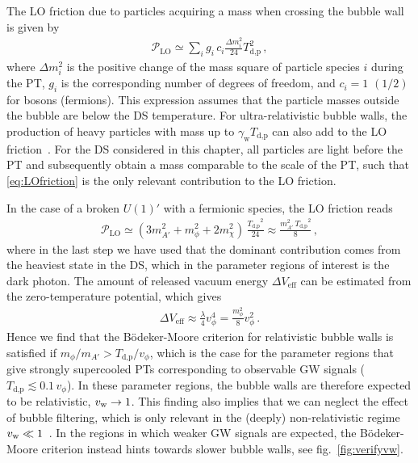 The \ac{LO} friction due to particles acquiring a mass when crossing the bubble wall is given
by~\cite{Bodeker:2009qy, Espinosa:2010hh}
\begin{align}
	\mathcal{P}_\mathrm{LO} \simeq \sum_i g_i \, c_i \frac{\Delta m_i^2}{24} T_\text{d,p}^2 \,, \label{eq:LOfriction}
\end{align}
where $\Delta m_i^2$ is the positive  change of the mass square of particle species $i$ during the \ac{PT}, $g_i$ is the corresponding number of degrees of freedom, and $c_i = 1$ $(1/2)$ for bosons (fermions). This expression assumes that the particle masses outside the bubble are below the \ac{DS} temperature. For ultra-relativistic bubble walls, the production of heavy particles with mass up to $\gamma_\text{w} T_\text{d,p}$ can also add to the \ac{LO} friction~\cite{Azatov:2020ufh}. For the \ac{DS} considered in this chapter, all particles are light before the \ac{PT} and subsequently obtain a mass comparable to the scale of the \ac{PT}, such that \eqref{eq:LOfriction} is the only relevant contribution to the \ac{LO} friction.

In the case of a broken $U(1)'$ with a fermionic species, the \ac{LO} friction reads~\cite{Espinosa:2010hh}
\begin{align}
	\mathcal{P}_\text{LO} \simeq \left(3 m_{A'}^2 + m_\phi^2 + 2 m_\chi^2\right) \, \frac{{T_{\text{d,p}}}^2}{24} \approx \frac{m_{A'}^2 \, {T_{\text{d,p}}}^2}{8} \,,
\end{align}
where in the last step we have used that the dominant contribution comes from the heaviest state in the \ac{DS}, which in the parameter regions of interest is the dark photon. The amount of released vacuum energy $\Delta V_\text{eff}$ can be estimated from the zero-temperature potential, which gives
\begin{align}
	\Delta V_\text{eff} \approx \frac{\lambda}{4} v_\phi^4 = \frac{m_\phi^2}{8} v_\phi^2 \,.
\end{align}
Hence we find that the Bödeker-Moore criterion for relativistic bubble walls is satisfied if $m_\phi / m_{A'} > {T_{\text{d,p}}} / v_\phi$, which is the case for the parameter regions that give strongly supercooled \acp{PT} corresponding to observable \ac{GW} signals ($T_{\text{d,p}} \lesssim 0.1 \, v_\phi$). In these parameter regions,  the bubble walls are therefore expected to be relativistic, $v_\mathrm{w} \rightarrow 1$. This finding also implies that we can neglect the effect of bubble filtering, which is only relevant in the (deeply) non-relativistic regime $v_\mathrm{w} \ll 1$~\cite{Baker:2019ndr,Chway:2019kft}. In the regions in which weaker \ac{GW} signals are expected, the Bödeker-Moore criterion instead hints towards slower bubble walls, see fig.~\ref{fig:verifyvw}.

